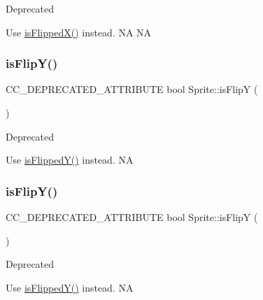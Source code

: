 \begin{DoxyRefDesc}{Deprecated}
\item[\hyperlink{deprecated__deprecated000270}{Deprecated}]Use \hyperlink{classSprite_af16052422347fb5a609f69191e9503e6}{is\+Flipped\+X()} instead.  NA  NA \end{DoxyRefDesc}
\mbox{\label{classSprite_aed312876fd0527225526da4af119727b}} 
\subsubsection{\texorpdfstring{is\+Flip\+Y()}{isFlipY()}\hspace{0.1cm}{\footnotesize\ttfamily [1/2]}}
{\footnotesize\ttfamily C\+C\+\_\+\+D\+E\+P\+R\+E\+C\+A\+T\+E\+D\+\_\+\+A\+T\+T\+R\+I\+B\+U\+TE bool Sprite\+::is\+FlipY (\begin{DoxyParamCaption}{ }\end{DoxyParamCaption})\hspace{0.3cm}{\ttfamily [inline]}}

\begin{DoxyRefDesc}{Deprecated}
\item[\hyperlink{deprecated__deprecated000042}{Deprecated}]Use \hyperlink{classSprite_aed48b9f71be4e6c1d0bd2bbc8377ff17}{is\+Flipped\+Y()} instead.  NA \end{DoxyRefDesc}
\mbox{\label{classSprite_aed312876fd0527225526da4af119727b}} 
\subsubsection{\texorpdfstring{is\+Flip\+Y()}{isFlipY()}\hspace{0.1cm}{\footnotesize\ttfamily [2/2]}}
{\footnotesize\ttfamily C\+C\+\_\+\+D\+E\+P\+R\+E\+C\+A\+T\+E\+D\+\_\+\+A\+T\+T\+R\+I\+B\+U\+TE bool Sprite\+::is\+FlipY (\begin{DoxyParamCaption}{ }\end{DoxyParamCaption})\hspace{0.3cm}{\ttfamily [inline]}}

\begin{DoxyRefDesc}{Deprecated}
\item[\hyperlink{deprecated__deprecated000272}{Deprecated}]Use \hyperlink{classSprite_aed48b9f71be4e6c1d0bd2bbc8377ff17}{is\+Flipped\+Y()} instead.  NA \end{DoxyRefDesc}
\mbox{\label{classSprite_aa457a666fd9c5620ff2290320748f79c}} 

